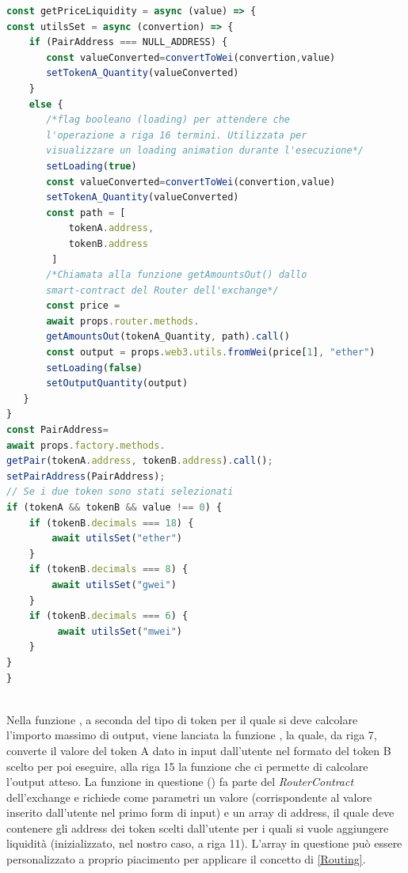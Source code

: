 \begin{lstlisting}[caption={[\textcourier{getPriceLiquidity()} Function]},language=jsx] 
const getPriceLiquidity = async (value) => {
const utilsSet = async (convertion) => {
    if (PairAddress === NULL_ADDRESS) {
       const valueConverted=convertToWei(convertion,value)
       setTokenA_Quantity(valueConverted)
    }
    else {
       /*flag booleano (loading) per attendere che
       l'operazione a riga 16 termini. Utilizzata per 
       visualizzare un loading animation durante l'esecuzione*/
       setLoading(true) 
       const valueConverted=convertToWei(convertion,value)
       setTokenA_Quantity(valueConverted)
       const path = [
           tokenA.address,
           tokenB.address
        ]
       /*Chiamata alla funzione getAmountsOut() dallo
       smart-contract del Router dell'exchange*/
       const price = 
       await props.router.methods.
       getAmountsOut(tokenA_Quantity, path).call()
       const output = props.web3.utils.fromWei(price[1], "ether")
       setLoading(false)
       setOutputQuantity(output)
   }
}
const PairAddress=
await props.factory.methods.
getPair(tokenA.address, tokenB.address).call();
setPairAddress(PairAddress);
// Se i due token sono stati selezionati
if (tokenA && tokenB && value !== 0) {
    if (tokenB.decimals === 18) {
        await utilsSet("ether")
    }
    if (tokenB.decimals === 8) {
        await utilsSet("gwei")
    }
    if (tokenB.decimals === 6) {
         await utilsSet("mwei")
    }
}
}
    																			     -getPriceLiquidity
\end{lstlisting}\makeatletter{}\makeatother
\label{getPriceLiquidity}

Nella funzione \textcourier{\ref{getPriceLiquidity}}, a seconda del tipo di token per il quale si deve calcolare l'importo massimo di output, viene lanciata la funzione , la quale, da riga 7,  converte il valore del token A dato in input dall'utente nel formato del token B scelto per poi eseguire, alla riga 15 la funzione che ci permette di calcolare l'output atteso.
La funzione in questione () fa parte del \textit{RouterContract} dell'exchange e richiede come parametri un valore (corrispondente al valore inserito dall'utente nel primo form di input) e un array di address, il quale deve contenere gli address dei token scelti dall'utente per i quali si vuole aggiungere liquidità (inizializzato, nel nostro caso, a riga 11). L'array in questione può essere personalizzato a proprio piacimento per applicare il concetto di \ref{Routing}.

